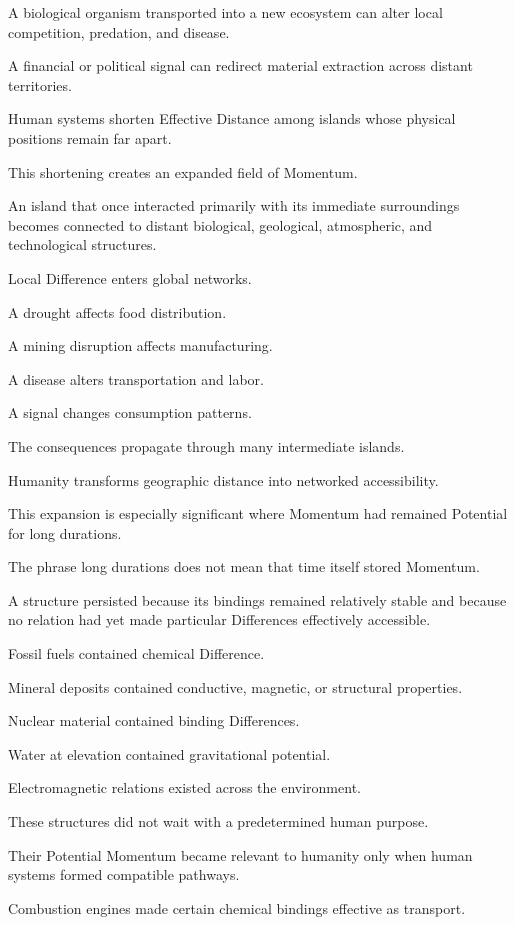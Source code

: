 A biological organism transported into a new ecosystem can alter local competition, predation, and disease.

A financial or political signal can redirect material extraction across distant territories.

Human systems shorten Effective Distance among islands whose physical positions remain far apart.

This shortening creates an expanded field of Momentum.

An island that once interacted primarily with its immediate surroundings becomes connected to distant biological, geological, atmospheric, and technological structures.

Local Difference enters global networks.

A drought affects food distribution.

A mining disruption affects manufacturing.

A disease alters transportation and labor.

A signal changes consumption patterns.

The consequences propagate through many intermediate islands.

Humanity transforms geographic distance into networked accessibility.

This expansion is especially significant where Momentum had remained Potential for long durations.

The phrase long durations does not mean that time itself stored Momentum.

A structure persisted because its bindings remained relatively stable and because no relation had yet made particular Differences effectively accessible.

Fossil fuels contained chemical Difference.

Mineral deposits contained conductive, magnetic, or structural properties.

Nuclear material contained binding Differences.

Water at elevation contained gravitational potential.

Electromagnetic relations existed across the environment.

These structures did not wait with a predetermined human purpose.

Their Potential Momentum became relevant to humanity only when human systems formed compatible pathways.

Combustion engines made certain chemical bindings effective as transport.

